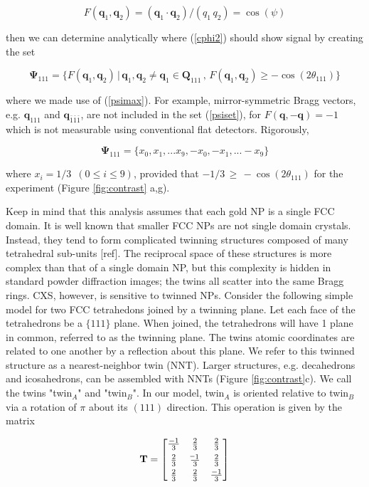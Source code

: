 \documentclass [11pt,fleqn]{article}
\newcommand*{\matminus}{%
  \leavevmode
  \hphantom{0}%
  \llap{%
    \settowidth{\dimen0 }{$0$}%
    \resizebox{1.1\dimen0 }{\height}{$-$}%
  }%
}
\def \be {\begin{equation}}
\def \ee {\end{equation}}
\begin{document}
\be
F( \bm q_1, \bm q_2) =  (\bm q_1 \cdot \bm q_2)/(q_1 \, q_2 ) = \cos( \psi )
\ee

then we can determine analytically where (\ref{cphi2}) should show signal by creating the set

\be \label{psiset}
\bm \Psi_{111} = \{ F( \bm q_1, \bm q_2)\, \big | \, \bm q_1, \bm q_2 \ne \bm q_1 \in \bm Q_{111}\, ,\,  F( \bm q_1, \bm q_2) \ge -\cos ( 2\theta_{111}  )  \}
\ee 

where we made use of (\ref{psimax}). For example, mirror-symmetric Bragg vectors, e.g. $\bm q_{111}$ and $\bm q_{\bar 1\bar 1\bar 1}$, are not included in the set  (\ref{psiset}), for $F(\bm q, -\bm q) = -1$ which is not measurable using conventional flat detectors. Rigorously,

\be
\bm \Psi_{111} = \{ x_0, x_1, ... x_9, -x_0, -x_1, ... -x_9 \}
\ee 

where $x_i = 1/3\,\,\, (0 \le i \le 9 )$, provided that $ -1/3 \, \ge \, - \cos (2\theta_{111}) $ for the experiment (Figure \ref{fig:contrast} a,g). 

Keep in mind that this analysis assumes that each gold NP is a single FCC domain. It is well known that smaller FCC NPs are not single domain crystals. Instead, they tend to form complicated twinning structures composed of many tetrahedral sub-units [ref]. The reciprocal space of these structures is more complex than that of a single domain NP, but this complexity is hidden in standard powder diffraction images; the twins all scatter into the same Bragg rings. CXS, however, is sensitive to twinned NPs. Consider the following simple model for two FCC tetrahedons joined by a twinning plane. Let each face of the tetrahedrons be a $\{111\}$ plane. When joined, the tetrahedrons will have 1 plane in common, referred to as the twinning plane. The twins atomic coordinates are related to one another by a reflection about this plane. We refer to this twinned structure as a nearest-neighbor twin (NNT). Larger structures, e.g. decahedrons and icosahedrons, can be assembled with NNTs (Figure \ref{fig:contrast}c). We call the twins "twin$_A$" and "twin$_B$".  In our model, twin$_A$ is oriented relative to twin$_B$ via a rotation of $\pi$ about its $(111)$ direction. This operation is given by the matrix

\be \label{twinmat}
\mathbf T = \begin{bmatrix}
       \frac{-1}{3} & \frac{2}{3} & \frac{2}{3}           \\[0.3em]
       \frac{2}{3} & \frac{\matminus 1}{3}           & \frac{2}{3} \\[0.3em]
       \frac{2}{3}           & \frac{2}{3} & \frac{-1}{3}
     \end{bmatrix}
\ee
\end{document}
